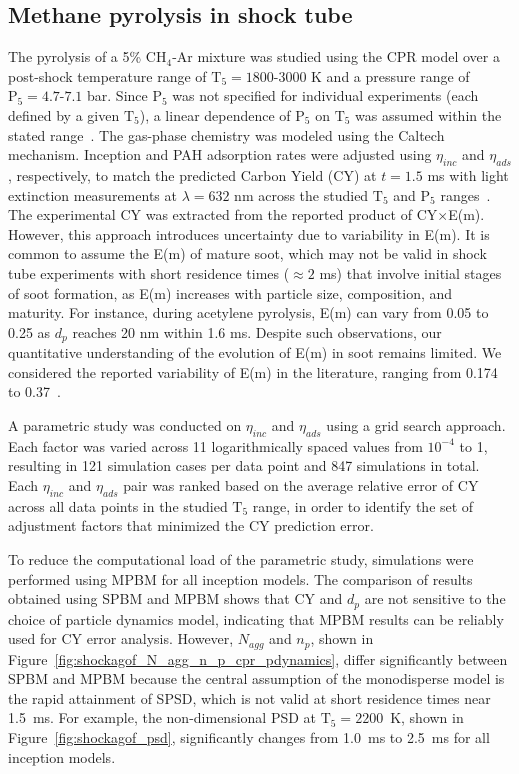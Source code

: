 \subsection{Methane pyrolysis in shock tube}

The pyrolysis of a 5\% $\mathrm{CH_4}$-Ar mixture was studied using the CPR model over a post-shock temperature range of $\mathrm{T_5} = 1800$-$3000$ K and a pressure range of $\mathrm{P_5} = 4.7$-$7.1$ bar. Since $\mathrm{P_5}$ was not specified for individual experiments (each defined by a given $\mathrm{T_5}$), a linear dependence of $\mathrm{P_5}$ on $\mathrm{T_5}$ was assumed within the stated range~\citep{agafonov2016unified}. The gas-phase chemistry was modeled using the Caltech mechanism. Inception and PAH adsorption rates were adjusted using $\eta_{inc}$ and $\eta_{ads}$, respectively, to match the predicted Carbon Yield (CY) at $t = 1.5$ ms with light extinction measurements at $\lambda = 632$ nm across the studied $\mathrm{T_5}$ and $\mathrm{P_5}$ ranges~\citep{agafonov2016unified}. The experimental CY was extracted from the reported product of CY$\times$E(m). However, this approach introduces uncertainty due to variability in E(m). It is common to assume the E(m) of mature soot, which may not be valid in shock tube experiments with short residence times ($\approx 2$ ms) that involve initial stages of soot formation, as E(m) increases with particle size, composition, and maturity. For instance, during acetylene pyrolysis, E(m) can vary from 0.05 to 0.25 as $d_p$ reaches 20 nm within 1.6 ms. Despite such observations, our quantitative understanding of the evolution of E(m) in soot remains limited. We considered the reported variability of E(m) in the literature, ranging from 0.174~\citep{lee1981optical} to 0.37~\citep{agafonov2011soot}.

A parametric study was conducted on $\eta_{inc}$ and $\eta_{ads}$ using a grid search approach. Each factor was varied across 11 logarithmically spaced values from $10^{-4}$ to 1, resulting in 121 simulation cases per data point and 847 simulations in total. Each $\eta_{inc}$ and $\eta_{ads}$ pair was ranked based on the average relative error of CY across all data points in the studied $\mathrm{T_5}$ range, in order to identify the set of adjustment factors that minimized the CY prediction error. 

To reduce the computational load of the parametric study, simulations were performed using MPBM for all inception models. The comparison of results obtained using SPBM and MPBM shows that CY and $d_p$ are not sensitive to the choice of particle dynamics model, indicating that MPBM results can be reliably used for CY error analysis. However, $N_{agg}$ and $n_p$, shown in Figure~\ref{fig:shockagof_N_agg_n_p_cpr_pdynamics}, differ significantly between SPBM and MPBM because the central assumption of the monodisperse model is the rapid attainment of SPSD, which is not valid at short residence times near 1.5~ms. For example, the non-dimensional PSD at $\mathrm{T_5}=2200$~K, shown in Figure~\ref{fig:shockagof_psd}, significantly changes from 1.0~ms to 2.5~ms for all inception models.

